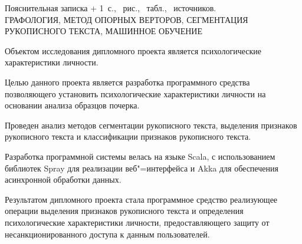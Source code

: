
\newcommand{\totpages}{\number\numexpr{} + 1}

\begin{center}
    Пояснительная записка \totpages~с., \totfig{}~рис., \tottab{}~табл., \totref{}~источников.
    \\ 
    \MakeUppercase{графология, метод опорных верторов, сегментация рукописного текста, машинное обучение}
\end{center}

Объектом исследования дипломного проекта является психологические характеристики личности.

Целью данного проекта является разработка программного средства позволяющего установить психологические характеристики личности на основании анализа образцов почерка.

Проведен анализ методов сегментации рукописного текста, выделения признаков рукописного текста и классификации признаков рукописного текста.

Разработка программной системы велась на языке Scala, с использованием библиотек Spray для реализации веб"=интерфейса и Akka для обеспечения асинхронной обработки данных. 

Результатом дипломного проекта стала программное средство реализующее операции выделения признаков рукописного текста и определения психологические характеристики личности, предоставляющего защиту от несанкционированного доступа к данным пользователей.

\clearpage
